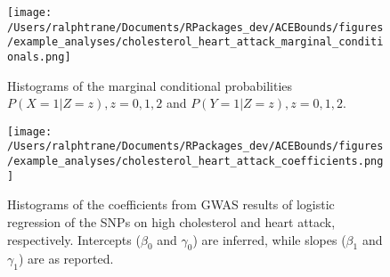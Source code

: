 \documentclass[
]{article}
\theoremstyle{plain}
\begin{document}
\begin{figure}[H]
  \center
  \texttt{[image: /Users/ralphtrane/Documents/RPackages\_dev/ACEBounds/figures/example\_analyses/cholesterol\_heart\_attack\_marginal\_conditionals.png]}
  \caption{Histograms of the marginal conditional probabilities $P(X = 1 | Z = z), z = 0,1,2$ and $P(Y = 1 | Z = z), z=0,1,2$.}
  \label{fig:smoking_on_depression_marginals}
\end{figure}

\begin{figure}[H]
  \center
  \texttt{[image: /Users/ralphtrane/Documents/RPackages\_dev/ACEBounds/figures/example\_analyses/cholesterol\_heart\_attack\_coefficients.png]}
  \caption{Histograms of the coefficients from GWAS results of logistic regression of the SNPs on high cholesterol and heart attack, respectively. Intercepts ($\beta_0$ and $\gamma_0$) are inferred, while slopes ($\beta_1$ and $\gamma_1$) are as reported.}
  \label{fig:marginal-distribution-of-coefficients-depression}
\end{figure}
\end{document}
